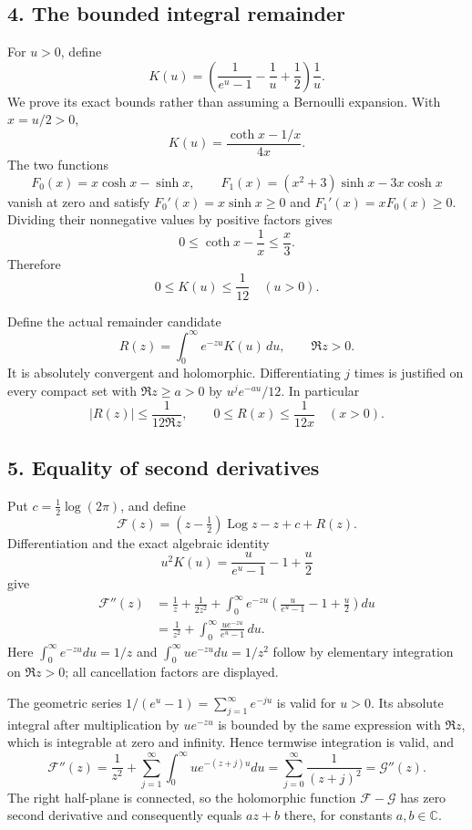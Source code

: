 \subsection{4. The bounded integral remainder}\label{GraphV2:the-bounded-integral-remainder}

For \(u>0\), define \[
K(u)=\left(\frac1{e^u-1}-\frac1u+\frac12\right)\frac1u.
\tag{BI16}
\] We prove its exact bounds rather than assuming a Bernoulli expansion. With \(x=u/2>0\), \[
K(u)=\frac{\coth x-1/x}{4x}.
\] The two functions \[
F_0(x)=x\cosh x-\sinh x,\qquad
F_1(x)=(x^2+3)\sinh x-3x\cosh x
\] vanish at zero and satisfy \(F_0'(x)=x\sinh x\ge0\) and \(F_1'(x)=xF_0(x)\ge0\). Dividing their nonnegative values by positive factors gives \[
0\le\coth x-\frac1x\le\frac{x}{3}.
\] Therefore \[
\boxed{0\le K(u)\le\frac1{12}\quad(u>0).}
\tag{BI17}
\]

Define the actual remainder candidate \[
R(z)=\int_0^\infty e^{-zu}K(u)\,du,\qquad \Re z>0.
\tag{BI18}
\] It is absolutely convergent and holomorphic. Differentiating \(j\) times is justified on every compact set with \(\Re z\ge a>0\) by \(u^je^{-au}/12\). In particular \[
|R(z)|\le\frac1{12\Re z},
\qquad 0\le R(x)\le\frac1{12x}\quad(x>0).
\tag{BI19}
\]

\subsection{5. Equality of second derivatives}\label{GraphV2:equality-of-second-derivatives}

Put \(c=\tfrac12\log(2\pi)\), and define \[
\mathcal F(z)=(z-\tfrac12)\operatorname{Log}z-z+c+R(z).
\tag{BI20}
\] Differentiation and the exact algebraic identity \[
u^2K(u)=\frac{u}{e^u-1}-1+\frac u2
\] give \[
\begin{split}
\mathcal F''(z)
&=\frac1z+\frac1{2z^2}
 +\int_0^\infty e^{-zu}
       \left(\frac{u}{e^u-1}-1+\frac u2\right)du\\
&=\frac1{z^2}
 +\int_0^\infty\frac{u e^{-zu}}{e^u-1}\,du.
\end{split}
\tag{BI21}
\] Here \(\int_0^\infty e^{-zu}du=1/z\) and \(\int_0^\infty ue^{-zu}du=1/z^2\) follow by elementary integration on \(\Re z>0\); all cancellation factors are displayed.

The geometric series \(1/(e^u-1)=\sum_{j=1}^\infty e^{-ju}\) is valid for \(u>0\). Its absolute integral after multiplication by \(ue^{-zu}\) is bounded by the same expression with \(\Re z\), which is integrable at zero and infinity. Hence termwise integration is valid, and \[
\mathcal F''(z)
=\frac1{z^2}+\sum_{j=1}^\infty
 \int_0^\infty ue^{-(z+j)u}du
=\sum_{j=0}^\infty\frac1{(z+j)^2}
=\mathcal G''(z).
\tag{BI22}
\] The right half-plane is connected, so the holomorphic function \(\mathcal F-\mathcal G\) has zero second derivative and consequently equals \(az+b\) there, for constants \(a,b\in\mathbb{C}\).


